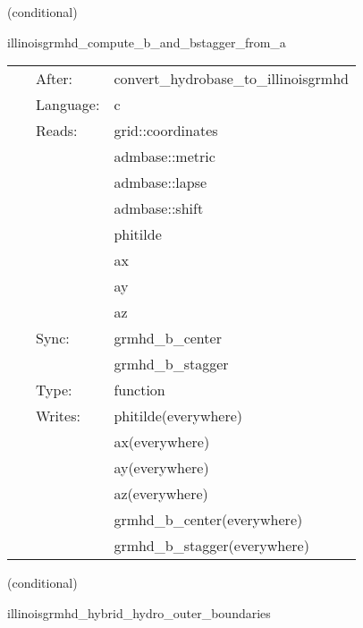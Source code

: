 \documentclass{article}
\begin{document}
\vspace{5mm}

   (conditional) 

\hspace{5mm} illinoisgrmhd\_compute\_b\_and\_bstagger\_from\_a 

\hspace{5mm}{\it compute b and b\_stagger from a } 


\hspace{5mm}

 \begin{tabular*}{160mm}{cll} 
~ & After:  & convert\_hydrobase\_to\_illinoisgrmhd \\ 
~ & Language:  & c \\ 
~ & Reads:  & grid::coordinates \\ 
~& ~ &admbase::metric\\ 
~& ~ &admbase::lapse\\ 
~& ~ &admbase::shift\\ 
~& ~ &phitilde\\ 
~& ~ &ax\\ 
~& ~ &ay\\ 
~& ~ &az\\ 
~ & Sync:  & grmhd\_b\_center \\ 
~& ~ &grmhd\_b\_stagger\\ 
~ & Type:  & function \\ 
~ & Writes:  & phitilde(everywhere) \\ 
~& ~ &ax(everywhere)\\ 
~& ~ &ay(everywhere)\\ 
~& ~ &az(everywhere)\\ 
~& ~ &grmhd\_b\_center(everywhere)\\ 
~& ~ &grmhd\_b\_stagger(everywhere)\\ 
\end{tabular*} 


\vspace{5mm}

   (conditional) 

\hspace{5mm} illinoisgrmhd\_hybrid\_hydro\_outer\_boundaries 

\hspace{5mm}{\it hybrid version of illinoisgrmhd\_outer\_boundaries } 


\hspace{5mm}
\end{document}
